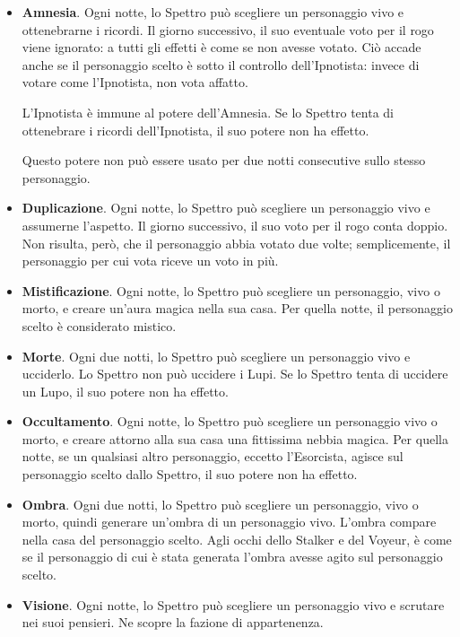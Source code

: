 \documentclass[a4paper,10pt]{article}
\begin{document}
\begin{itemize}
 \item {\bf Amnesia}. Ogni notte, lo Spettro può scegliere un personaggio vivo e
ottenebrarne i ricordi. Il giorno successivo, il suo eventuale voto per il rogo
viene ignorato: a tutti gli effetti è come se non avesse votato. Ciò accade
anche se il personaggio scelto è sotto il controllo dell'Ipnotista: invece di
votare come l'Ipnotista, non vota affatto.
 
 L'Ipnotista è immune al potere dell'Amnesia. Se lo Spettro tenta di ottenebrare
i ricordi dell'Ipnotista, il suo potere non ha effetto.
 
 Questo potere non può essere usato per due notti consecutive sullo stesso
personaggio.

 \item {\bf Duplicazione}. Ogni notte, lo Spettro può scegliere un personaggio
vivo e assumerne l'aspetto. Il giorno successivo, il suo voto per il rogo conta
doppio. Non risulta, però, che il personaggio abbia votato due volte;
semplicemente, il personaggio per cui vota riceve un voto in più.

 \item {\bf Mistificazione}. Ogni notte, lo Spettro può scegliere un personaggio,
vivo o morto, e creare un'aura magica nella sua casa. Per quella notte, il
personaggio scelto è considerato mistico. 
 
 \item {\bf Morte}. Ogni due notti, lo Spettro può scegliere un personaggio vivo
e ucciderlo.
 Lo Spettro non può uccidere i Lupi. Se lo Spettro tenta di uccidere un Lupo,
il suo potere non ha effetto.
 
 \item {\bf Occultamento}. Ogni notte, lo Spettro può scegliere un personaggio
vivo o morto, e creare attorno alla sua casa una fittissima nebbia magica. Per
quella notte, se un qualsiasi altro personaggio, eccetto l'Esorcista, agisce sul
personaggio scelto dallo Spettro, il suo potere non ha effetto.
 
 \item {\bf Ombra}. Ogni due notti, lo Spettro può scegliere un personaggio, vivo o
morto, quindi generare un'ombra di un personaggio vivo. L'ombra compare nella
casa del personaggio scelto.
 Agli occhi dello Stalker e del Voyeur, è come se il personaggio di cui è stata
generata l'ombra avesse agito sul personaggio scelto.
 
 \item {\bf Visione}. Ogni notte, lo Spettro può scegliere un personaggio vivo e
scrutare nei suoi pensieri. Ne scopre la fazione di appartenenza.
 
\end{itemize}
\end{document}
